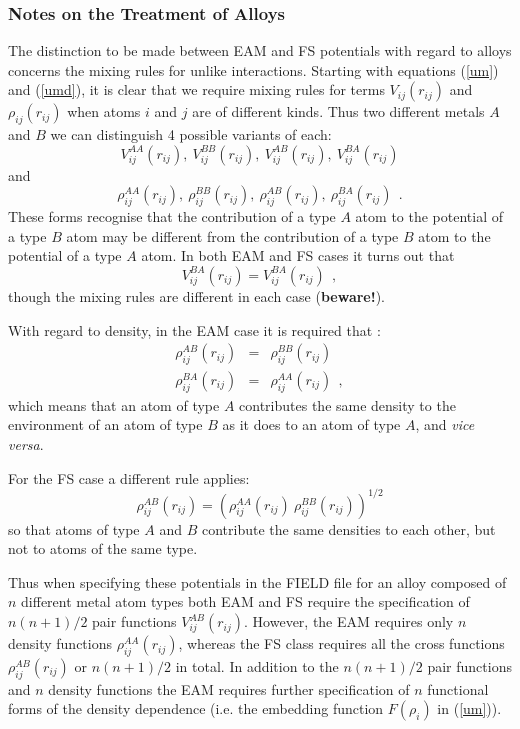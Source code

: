 \subsubsection*{Notes on the Treatment of Alloys}

The distinction to be made between EAM and FS potentials with regard to
alloys concerns the mixing rules for unlike interactions.  Starting with
equations (\ref{um}) and (\ref{umd}), it is clear that we require mixing
rules for terms $V_{ij}(r_{ij})$ and $\rho_{ij}(r_{ij})$ when atoms $i$
and $j$ are of different kinds.  Thus two different metals $A$ and $B$ we
can distinguish 4 possible variants of each:
\[V^{AA}_{ij}(r_{ij}),~V^{BB}_{ij}(r_{ij}),~V^{AB}_{ij}(r_{ij}),
~V^{BA}_{ij}(r_{ij})\]
and
\[\rho^{AA}_{ij}(r_{ij}),~\rho^{BB}_{ij}(r_{ij}),~\rho^{AB}_{ij}(r_{ij}),
~\rho^{BA}_{ij}(r_{ij})~~.\]
These forms recognise that the contribution of a type $A$ atom to
the potential of a type $B$ atom may be different from the
contribution of a type $B$ atom to the potential of a type $A$ atom.
In both EAM \cite{johnson-89a} and FS \cite{sutton-91a} cases it
turns out that
\begin{equation}
V^{BA}_{ij}(r_{ij})=V^{BA}_{ij}(r_{ij})~~,
\end{equation}
though the mixing rules are different in each case ({\bf beware!}).

With regard to density, in the EAM case it is required that
\cite{johnson-89a}:
\begin{eqnarray}
\rho^{AB}_{ij}(r_{ij})&=&\rho^{BB}_{ij}(r_{ij}) \nonumber \\
\rho^{BA}_{ij}(r_{ij})&=&\rho^{AA}_{ij}(r_{ij})~~,
\end{eqnarray}
which means that an atom of type $A$ contributes the same density to
the environment of an atom of type $B$ as it does to an atom of type
$A$, and {\em vice versa}.

For the FS case \cite{sutton-91a} a different rule applies:
\begin{equation}
\rho^{AB}_{ij}(r_{ij})=(\rho^{AA}_{ij}(r_{ij})~\rho^{BB}_{ij}(r_{ij}))^{1/2}
\end{equation}
so that atoms of type $A$ and $B$ contribute the same densities to
each other, but not to atoms of the same type.

Thus when specifying these potentials in the \D FIELD file for
an alloy composed of $n$ different metal atom types both EAM and FS
require the specification of $n(n+1)/2$ pair functions
$V^{AB}_{ij}(r_{ij})$.  However, the EAM requires only $n$ density
functions $\rho^{AA}_{ij}(r_{ij})$, whereas the FS class requires all
the cross functions $\rho^{AB}_{ij}(r_{ij})$ or $n(n+1)/2$ in total.
In addition to the $n(n+1)/2$ pair functions and $n$ density functions
the EAM requires further specification of $n$ functional forms of the
density dependence (i.e. the embedding function $F(\rho_{i})$ in (\ref{um})).

